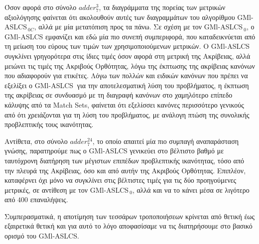 Όσον αφορά στο σύνολο $adder_{7}^{3}$, τα διαγράμματα της πορείας των μετρικών αξιολόγησης φαίνεται ότι ακολουθούν αυτές των διαγραμμάτων του αλγορίθμου GMl-ASLCS$_{\:0C}$, αλλά με μία μετατόπιση προς τα πάνω. Σε σχέση με τον GMl-ASLCS$_{\:0}$, ο GMl-ASLCS εμφανίζει και εδώ μία πιο συνεπή συμπεριφορά, που καταδεικνύεται από τη μείωση του εύρους των τιμών των χρησιμοποιούμενων μετρικών. Ο GMl-ASLCS$_{\:}$ συγκλίνει γρηγορότερα στις ίδιες τιμές όσον αφορά στη μετρική της Ακρίβειας, αλλά μειώνει τις τιμές της Ακριβούς Ορθότητας, λόγω της έκπτωσης της ακρίβειας κανόνων που αδιαφορούν για ετικέτες. Λόγω των πολλών και ειδικών κανόνων που πρέπει να εξελίξει ο GMl-ASLCS$_{\:}$ για την αποτελεσματική λύση του προβλήματος, η έκπτωση της ακρίβειας σε συνδυασμό με τη διαγραφή κανόνων στο χαμηλότερο επίπεδο κάλυψης από τα Match Sets, φαίνεται ότι εξελίσσει κανόνες περισσότερο γενικούς από ότι χρειάζονται για τη λύση του προβλήματος, με ανάλογη πτώση της συνολικής προβλεπτικής τους ικανότητας.

Αντίθετα, στο σύνολο $adder_{7}^{24}$, το οποίο απαιτεί μία πιο συμπαγή αναπαράσταση γνώσης, παρατηρούμε πως ο GMl-ASLCS γενικεύει στο βέλτιστο βαθμό με ταυτόχρονη διατήρηση των μέγιστων επιπέδων προβλεπτικής ικανότητας, τόσο από την πλευρά της Ακρίβειας, όσο και από αυτήν της Ακριβούς Ορθότητας. Επιπλέον, καταφέρνει όχι μόνο να συγκλίνει στις βέλτιστες τιμές για τις δύο προηγούμενες μετρικές, σε αντίθεση με τον GMl-ASLCS$_{\:0}$, αλλά και να το κάνει μέσα σε λιγότερο από $400$ επαναλήψεις.

Συμπερασματικά, η αποτίμηση των τεσσάρων τροποποιήσεων κρίνεται από θετική έως εξαιρετικά θετική και για αυτό το λόγο αποφασίσαμε να τις διατηρήσουμε στο βασικό ορισμό του GMl-ASLCS.













